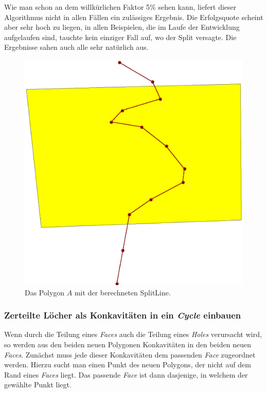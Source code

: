 Wie man schon an dem willkürlichen Faktor 5\% sehen kann, liefert dieser Algorithmus nicht in allen Fällen ein zulässiges Ergebnis. Die Erfolgsquote scheint aber sehr hoch zu liegen, in allen Beispielen, die im Laufe der Entwicklung aufgelaufen sind, tauchte kein einziger Fall auf, wo der Split versagte. Die Ergebnisse sahen auch alle sehr natürlich aus.


\begin{figure}
	\centering
	\includegraphics[scale=0.6]{Ergebnis.eps}
	\caption{Das Polygon $A$ mit der berechneten SplitLine.}
	\label{fig:SplitLine}
\end{figure}


\subsubsection{Zerteilte Löcher als Konkavitäten in ein \textit{Cycle} einbauen}\label{JoinLL}

Wenn durch die Teilung eines \textit{Faces} auch die Teilung eines \textit{Holes} verursacht wird, so werden aus den beiden neuen Polygonen Konkavitäten in den beiden neuen \textit{Faces}. Zunächst muss jede dieser Konkavitäten dem passenden \textit{Face} zugeordnet werden. Hierzu sucht man einen Punkt des neuen Polygons, der nicht auf dem Rand eines \textit{Faces} liegt. Das passende \textit{Face} ist dann dasjenige, in welchem der gewählte Punkt liegt. 

